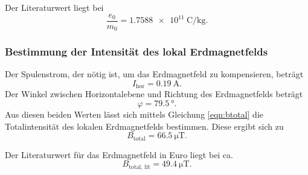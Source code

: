 \noindent Der Literaturwert liegt bei 
\begin{equation*}
    \frac{e_0}{m_0} = \SI{1.7588e11}{\coulomb\per\kilo\gram}.
\end{equation*}

\subsubsection{Bestimmung der Intensität des lokal Erdmagnetfelds}
Der Spulenstrom, der nötig ist, um das Erdmagnetfeld zu
kompensieren, beträgt
\begin{equation*}
    I_\text{hor} = \SI{0.19}{\ampere}.
\end{equation*}
Der Winkel zwischen Horizontalebene und Richtung des Erdmagnetfelds
beträgt
\begin{equation*}
    \varphi = \SI{79.5}{\degree}.
\end{equation*}
Aus diesen beiden Werten lässt sich mittels Gleichung \eqref{eqn:btotal}
die Totalintensität des lokalen Erdmagnetfelds bestimmen.
Diese ergibt sich zu
\begin{equation*}
    B_\text{total} = \SI{66.5}{\micro\tesla}.
\end{equation*}

\noindent Der Literaturwert für das Erdmagnetfeld in Euro \cite{btotal} liegt bei ca.
\begin{equation*}
    B_\text{total, lit} = \SI{49.4}{\micro\tesla}.
\end{equation*} %
